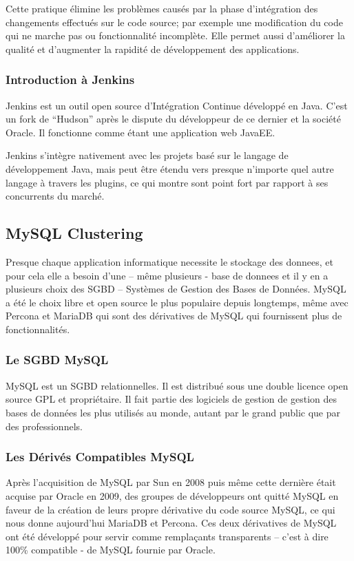 \documentclass[a4paper,11pt,oneside]{report}
\begin{document}
Cette pratique élimine les problèmes causés par la phase d’intégration des changements effectués sur le code source; par exemple une modification du code qui ne marche pas ou fonctionnalité incomplète. Elle permet aussi d’améliorer la qualité et d’augmenter la rapidité de développement des applications.

\subsubsection{Introduction à Jenkins}
Jenkins est un outil open source d’Intégration Continue développé en Java. C’est un fork de “Hudson” après le dispute du développeur de ce dernier et la société Oracle. Il fonctionne comme étant une application web JavaEE. 
\newline

Jenkins s’intègre nativement avec les projets basé sur le langage de développement Java, mais peut être étendu vers presque n’importe quel autre langage à travers les plugins, ce qui montre sont point fort par rapport à ses concurrents du marché.

\subsection{MySQL Clustering}

Presque chaque application informatique necessite le stockage des donnees, et pour cela elle a besoin d’une – même plusieurs - base de donnees et il y en a plusieurs choix des SGBD – Systèmes de Gestion des Bases de Données. MySQL a été le choix libre et open source le plus populaire depuis longtemps, même avec Percona et MariaDB qui sont des dérivatives de MySQL qui fournissent plus de fonctionnalités.

\subsubsection{Le SGBD MySQL}
MySQL est un SGBD relationnelles. Il est distribué sous une double licence open source GPL et propriétaire. Il fait partie des logiciels de gestion de gestion des bases de données les plus utilisés au monde, autant par le grand public que par des professionnels.

\subsubsection{Les Dérivés Compatibles MySQL}
Après l’acquisition de MySQL par Sun en 2008 puis même cette dernière était acquise par Oracle en 2009, des groupes de développeurs ont quitté MySQL en faveur de la création de leurs propre dérivative  du code source MySQL, ce qui nous donne aujourd’hui MariaDB et Percona. Ces deux dérivatives de MySQL ont été développé pour servir comme remplaçants transparents – c’est à dire 100\% compatible - de MySQL fournie par Oracle.
\newline
\end{document}
